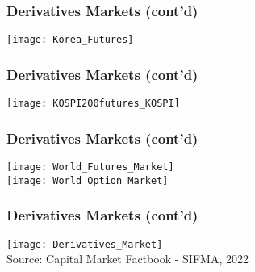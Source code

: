 \documentclass[10pt]{beamer}
\begin{document}
	
	\begin{frame}
		\frametitle{Derivatives Markets (cont'd)} %
		\begin{center}
			\texttt{[image: Korea\_Futures]} \\
		\end{center}
		
	\end{frame}	
	
	
	\begin{frame}
		\frametitle{Derivatives Markets (cont'd)} %
		\begin{center}
			\texttt{[image: KOSPI200futures\_KOSPI]} \\
		\end{center}
		
	\end{frame}	
	
	
	\begin{frame}
		\frametitle{Derivatives Markets (cont'd)} %
		\begin{center}
			\texttt{[image: World\_Futures\_Market]} \\
			\texttt{[image: World\_Option\_Market]}
		\end{center}
		
	\end{frame}	
	
	
	
	\begin{frame}
		\frametitle{Derivatives Markets (cont'd)} %
		\begin{center}
			\texttt{[image: Derivatives\_Market]} \\
			{\scriptsize Source: Capital Market Factbook - SIFMA, 2022}		
		\end{center}
		
	\end{frame}	
	
	
	
\end{document}
